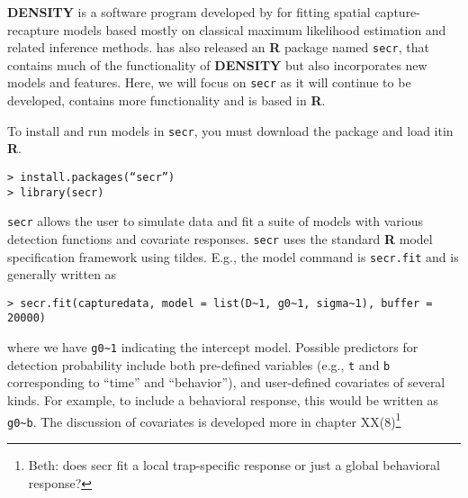 {\bf DENSITY} is a software program developed by \citet{efford:2004}
for fitting spatial capture-recapture models based mostly on classical
maximum likelihood estimation and related inference methods.
\citet{efford:2011} has also released an {\bf R} package named
\mbox{\tt secr}, that contains much of the functionality of {\bf
  DENSITY} but also incorporates new models and features.  Here, we
will focus on \mbox{\tt secr} as it will continue to be developed,
contains more functionality and is based in {\bf R}.


 To install
and run models in \mbox{\tt secr}, you must download the package and load itin
{\bf R}.
\begin{verbatim}
> install.packages(“secr”)
> library(secr)
\end{verbatim}
\mbox{\tt secr} allows the user to simulate data and fit a suite of models with
various detection functions and covariate responses.  \mbox{\tt secr}
uses the
standard {\bf R} model specification framework using tildes. E.g., the model
command is \mbox{\tt secr.fit} and is generally written as
\begin{verbatim}
> secr.fit(capturedata, model = list(D~1, g0~1, sigma~1), buffer = 20000)
\end{verbatim}
where we have \verb#g0~1# indicating the intercept model. 
 Possible predictors for detection probability include both
pre-defined variables (e.g., \mbox{\tt t} and \mbox{\tt b}
corresponding to ``time'' and 
``behavior''), and user-defined covariates of several kinds. 
For example, to include a behavioral response, this would be written
as \verb#g0~b#.
The discussion of covariates is developed more in chapter XX(8)\footnote{Beth:
  does secr fit a local trap-specific response or just a global
  behavioral response?}

